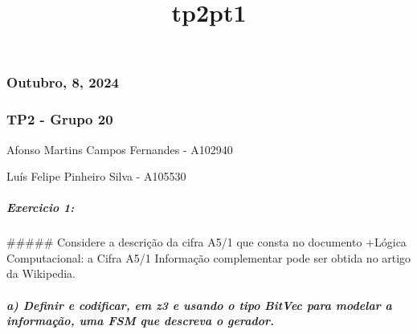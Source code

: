\documentclass[11pt]{article}
\title{tp2pt1}
\begin{document}
    
    \maketitle
    
    

    
    \hypertarget{outubro-8-2024}{%
\subsubsection{Outubro, 8, 2024}\label{outubro-8-2024}}

\hypertarget{tp2---grupo-20}{%
\subsubsection{TP2 - Grupo 20}\label{tp2---grupo-20}}

Afonso Martins Campos Fernandes - A102940

Luís Felipe Pinheiro Silva - A105530

\hypertarget{exercicio-1}{%
\subparagraph{Exercicio 1:}\label{exercicio-1}}

\#\#\#\#\# Considere a descrição da cifra A5/1 que consta no documento
+Lógica Computacional: a Cifra A5/1 Informação complementar pode ser
obtida no artigo da Wikipedia.

\hypertarget{a-definir-e-codificar-em-z3-e-usando-o-tipo-bitvec-para-modelar-a-informauxe7uxe3o-uma-fsm-que-descreva-o-gerador.}{%
\subparagraph{a) Definir e codificar, em z3 e usando o tipo BitVec para
modelar a informação, uma FSM que descreva o
gerador.}\label{a-definir-e-codificar-em-z3-e-usando-o-tipo-bitvec-para-modelar-a-informauxe7uxe3o-uma-fsm-que-descreva-o-gerador.}}
\end{document}
